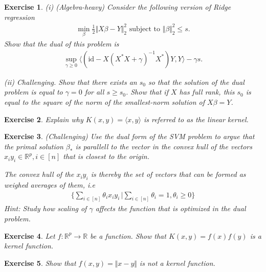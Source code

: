 \documentclass{article}
\newcommand{\id}{\mathrm{id}}
\newcommand{\sprod}[1]{\langle #1 \rangle}
\newcommand{\R}{\mathbb{R}}
\newtheorem{exercise}{Exercise}
\newcommand{\norm}[1]{\Vert #1 \Vert}
\begin{document}
\begin{exercise}
    (i) (\emph{Algebra-heavy}) Consider the following version of Ridge regression
    \begin{align*}
        \min_{\beta} \tfrac{1}{2}\norm{X\beta-Y}_2^2 \text{ subject to } \norm{\beta}_2^2 \leq s.
    \end{align*}
    Show that the dual of this problem is
    \begin{align*}
        \sup_{\gamma \geq 0 } \sprod{(\id - X(X^*X+\gamma)^{-1}X^*)Y,Y} -\gamma s.
    \end{align*}

    (ii) \emph{Challenging}. Show that there exists an $s_0$ so that the solution of the dual problem is equal to $\gamma=0$ for all $s\geq s_0$. Show that if $X$ has full rank, this $s_0$ is equal to the square of the norm of the smallest-norm solution of $X\beta=Y$.
\end{exercise}

\begin{exercise}
    Explain why $K(x,y) = \sprod{x,y}$ is referred to as the \emph{linear kernel}.
\end{exercise}

\begin{exercise}
    (\emph{Challenging}) Use the dual form of the SVM problem to argue that the primal solution $\beta_*$ is parallell to the vector in the \emph{convex hull} of the vectors $x_iy_i \in \R^p, i\in[n]$ that is closest to the origin. 
    
    The convex hull of the $x_iy_i$ is thereby the set of vectors that can be formed as weighed averages of them, i.e
    \begin{align*}
        \{ \sum_{i \in [n]} \theta_i x_iy_i \, \vert \sum_{i\in [n]} \theta_i= 1, \theta_i \geq 0 \}
    \end{align*}
    \emph{Hint}: Study how scaling of $\gamma$ affects the function that is optimized in the dual problem.
\end{exercise}

\begin{exercise}
    Let $f: \R^p\to \R$ be a function. Show that $K(x,y)=f(x)f(y)$ is a kernel function.
\end{exercise}

\begin{exercise}
    Show that $f(x,y) = \norm{x-y}$ is \emph{not} a kernel function.
\end{exercise}
\end{document}
